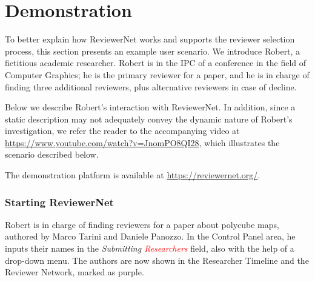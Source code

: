 \chapter{Demonstration}\label{sec:demonstration}
To better explain how ReviewerNet works and supports the reviewer selection process, this section presents an example user scenario. We introduce Robert, a fictitious academic researcher. Robert is in the IPC of a conference in the field of Computer Graphics; he is the primary reviewer for a paper, and he is in charge of finding three additional reviewers, plus alternative reviewers in case of decline. 

Below we describe Robert's interaction with ReviewerNet. In addition, since a static description may not adequately convey the dynamic nature of Robert's investigation, we refer the reader to the accompanying video at \url{https://www.youtube.com/watch?v=JnomPO8QI28}, which illustrates the scenario described below. 

The demonstration platform is available at \url{https://reviewernet.org/}. 

\subsection*{Starting ReviewerNet}

Robert is in charge of finding reviewers for a paper about polycube maps, authored by Marco Tarini and Daniele Panozzo. In the Control Panel area, he inputs their names in the \emph{Submitting \textcolor{red}{Researchers}} field, also with the help of a drop-down menu. The authors are now shown in the Researcher Timeline and the Reviewer Network, marked as purple. 

